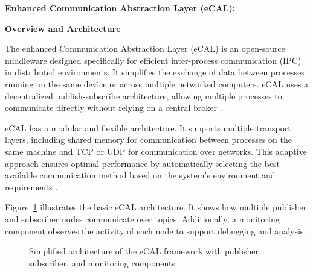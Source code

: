 \vspace{1em}
\textbf{Enhanced Communication Abstraction Layer (eCAL):}
\vspace{0.4em}

\textbf{Overview and Architecture}
\vspace{0.4em}

The enhanced Communication Abstraction Layer (eCAL) is an open-source middleware designed specifically for efficient inter-process communication (IPC) in distributed environments. It simplifies the exchange of data between processes running on the same device or across multiple networked computers. eCAL uses a decentralized publish-subscribe architecture, allowing multiple processes to communicate directly without relying on a central broker \cite{ecal_github}.

\vspace{1em}
eCAL has a modular and flexible architecture. It supports multiple transport layers, including shared memory for communication between processes on the same machine and TCP or UDP for communication over networks. This adaptive approach ensures optimal performance by automatically selecting the best available communication method based on the system's environment and requirements \cite{ecal_official_docs}.

\vspace{1em}
Figure~\ref{fig:ecal_architecture} illustrates the basic eCAL architecture. It shows how multiple publisher and subscriber nodes communicate over topics. Additionally, a monitoring component observes the activity of each node to support debugging and analysis.
\\
\begin{figure}[H]
	\centering
	\caption{Simplified architecture of the eCAL framework with publisher, subscriber, and monitoring components}
	\label{fig:ecal_architecture}
\end{figure}


